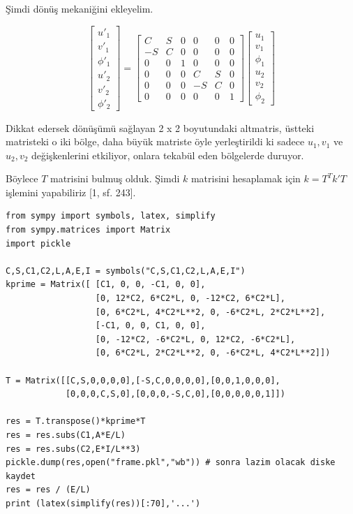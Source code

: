 \documentclass[12pt,fleqn]{article}\usepackage{../../common}
\begin{document}
Şimdi dönüş mekaniğini ekleyelim.

$$
\left[\begin{array}{ccc}
u'_1 \\ v'_1 \\ \phi'_1 \\ u'_2 \\ v'_2 \\ \phi'_2 
\end{array}\right] =
\left[\begin{array}{cccccc}
C & S & 0 & 0 & 0 & 0 \\
-S & C & 0 & 0 & 0 & 0 \\
0 & 0 & 1 & 0 & 0 & 0 \\
0 & 0 & 0 & C & S & 0 \\
0 & 0 & 0 & -S & C & 0 \\
0 & 0 & 0 & 0 & 0 & 1
\end{array}\right]
\left[\begin{array}{ccc}
u_1 \\ v_1 \\ \phi_1 \\ u_2 \\ v_2 \\ \phi_2 
\end{array}\right]
$$

Dikkat edersek dönüşümü sağlayan 2 x 2 boyutundaki altmatris, üstteki matristeki
o iki bölge, daha büyük matriste öyle yerleştirildi ki sadece $u_1,v_1$ ve
$u_2,v_2$ değişkenlerini etkiliyor, onlara tekabül eden bölgelerde duruyor.

Böylece $T$ matrisini bulmuş olduk. Şimdi $k$ matrisini hesaplamak için
$k = T^T k' T$ işlemini yapabiliriz [1, sf. 243].

\begin{verbatim}
from sympy import symbols, latex, simplify
from sympy.matrices import Matrix
import pickle

C,S,C1,C2,L,A,E,I = symbols("C,S,C1,C2,L,A,E,I")
kprime = Matrix([ [C1, 0, 0, -C1, 0, 0],
                  [0, 12*C2, 6*C2*L, 0, -12*C2, 6*C2*L],
                  [0, 6*C2*L, 4*C2*L**2, 0, -6*C2*L, 2*C2*L**2],
                  [-C1, 0, 0, C1, 0, 0],
                  [0, -12*C2, -6*C2*L, 0, 12*C2, -6*C2*L],
                  [0, 6*C2*L, 2*C2*L**2, 0, -6*C2*L, 4*C2*L**2]])

T = Matrix([[C,S,0,0,0,0],[-S,C,0,0,0,0],[0,0,1,0,0,0],
            [0,0,0,C,S,0],[0,0,0,-S,C,0],[0,0,0,0,0,1]])

res = T.transpose()*kprime*T
res = res.subs(C1,A*E/L) 
res = res.subs(C2,E*I/L**3)
pickle.dump(res,open("frame.pkl","wb")) # sonra lazim olacak diske kaydet
res = res / (E/L) 
print (latex(simplify(res))[:70],'...')
\end{verbatim}
\end{document}
